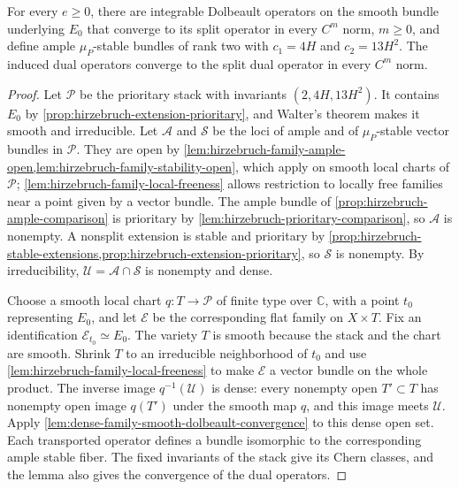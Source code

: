 \begin{theorem}\label{thm:hirzebruch-stable-ample-approximation}
For every $e\geq0$, there are integrable Dolbeault operators on the smooth bundle underlying $E_0$ that converge to its split operator in every $C^m$ norm, $m\geq0$, and define ample $\mu_P$-stable bundles of rank two with $c_1=4H$ and $c_2=13H^2$. The induced dual operators converge to the split dual operator in every $C^m$ norm.
\end{theorem}
\begin{proof}
Let $\mathcal P$ be the prioritary stack with invariants $(2,4H,13H^2)$. It contains $E_0$ by \cref{prop:hirzebruch-extension-prioritary}, and Walter's theorem makes it smooth and irreducible. Let $\mathcal A$ and $\mathcal S$ be the loci of ample and of $\mu_P$-stable vector bundles in $\mathcal P$. They are open by \cref{lem:hirzebruch-family-ample-open,lem:hirzebruch-family-stability-open}, which apply on smooth local charts of $\mathcal P$; \cref{lem:hirzebruch-family-local-freeness} allows restriction to locally free families near a point given by a vector bundle. The ample bundle of \cref{prop:hirzebruch-ample-comparison} is prioritary by \cref{lem:hirzebruch-prioritary-comparison}, so $\mathcal A$ is nonempty. A nonsplit extension is stable and prioritary by \cref{prop:hirzebruch-stable-extensions,prop:hirzebruch-extension-prioritary}, so $\mathcal S$ is nonempty. By irreducibility, $\mathcal U=\mathcal A\cap\mathcal S$ is nonempty and dense.

Choose a smooth local chart $q\colon T\to\mathcal P$ of finite type over $\mathbb C$, with a point $t_0$ representing $E_0$, and let $\mathcal E$ be the corresponding flat family on $X\times T$. Fix an identification $\mathcal E_{t_0}\simeq E_0$. The variety $T$ is smooth because the stack and the chart are smooth. Shrink $T$ to an irreducible neighborhood of $t_0$ and use \cref{lem:hirzebruch-family-local-freeness} to make $\mathcal E$ a vector bundle on the whole product. The inverse image $q^{-1}(\mathcal U)$ is dense: every nonempty open $T'\subset T$ has nonempty open image $q(T')$ under the smooth map $q$, and this image meets $\mathcal U$. Apply \cref{lem:dense-family-smooth-dolbeault-convergence} to this dense open set. Each transported operator defines a bundle isomorphic to the corresponding ample stable fiber. The fixed invariants of the stack give its Chern classes, and the lemma also gives the convergence of the dual operators.
\end{proof}

